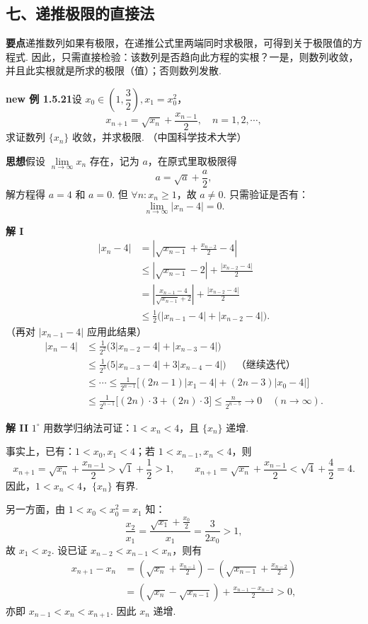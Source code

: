 \documentclass[UTF8, 12pt, fontset=fandol, oneside]{ctexart}
\begin{document}
\subsection*{七、递推极限的直接法}

\noindent\textbf{要点}\quad 递推数列如果有极限，在递推公式里两端同时求极限，可得到关于极限值的方程式. 因此，只需直接检验：该数列是否趋向此方程的实根？一是，则数列收敛，并且此实根就是所求的极限（值）；否则数列发散.

\noindent\textbf{new 例 1.5.21}\quad 设 $x_0\in\left(1,\dfrac32\right),x_1=x_0^2$，
\[
  x_{n+1}=\sqrt{x_n}+\frac{x_{n-1}}2,\quad n=1,2,\cdots,
\]
求证数列 $\{x_n\}$ 收敛，并求极限. （中国科学技术大学）

\noindent\textbf{思想}\quad 假设 $\lim\limits_{n\to\infty}x_n$ 存在，记为 $a$，在原式里取极限得
\[
  a=\sqrt a+\frac a2,
\]
解方程得 $a=4$ 和 $a=0$. 但 $\forall n:x_n\ge 1$，故 $a\ne 0$. 只需验证是否有：
\[
  \lim_{n\to\infty}|x_n-4|=0.
\]

\noindent\textbf{解 I}\quad
\[
\begin{aligned}
  |x_n-4|
  &=\left|\sqrt{x_{n-1}}+\frac{x_{n-2}}2-4\right|\\
  &\le |\sqrt{x_{n-1}}-2|+\frac{|x_{n-2}-4|}{2}\\
  &=\left|\frac{x_{n-1}-4}{\sqrt{x_{n-1}}+2}\right|
    +\frac{|x_{n-2}-4|}{2}\\
  &\le \frac12\bigl(|x_{n-1}-4|+|x_{n-2}-4|\bigr).
\end{aligned}
\]
（再对 $|x_{n-1}-4|$ 应用此结果）
\[
\begin{aligned}
  |x_n-4|
  &\le \frac1{2^2}\bigl(3|x_{n-2}-4|+|x_{n-3}-4|\bigr)\\
  &\le \frac1{2^3}\bigl(5|x_{n-3}-4|+3|x_{n-4}-4|\bigr)
   \quad \text{（继续迭代）}\\
  &\le \cdots \le
   \frac1{2^{n-1}}\bigl[(2n-1)|x_1-4|+(2n-3)|x_0-4|\bigr]\\
  &\le \frac1{2^{n-1}}\bigl[(2n)\cdot 3+(2n)\cdot 3\bigr]
   \le \frac{n}{2^{n-5}}\to 0\quad (n\to\infty).
\end{aligned}
\]

\noindent\textbf{解 II}\quad
$1^\circ$ 用数学归纳法可证：$1<x_n<4$，且 $\{x_n\}$ 递增.

事实上，已有：$1<x_0,x_1<4$；若 $1<x_{n-1},x_n<4$，则
\[
  x_{n+1}=\sqrt{x_n}+\frac{x_{n-1}}2
  >\sqrt1+\frac12>1,\qquad
  x_{n+1}=\sqrt{x_n}+\frac{x_{n-1}}2
  <\sqrt4+\frac42=4.
\]
因此，$1<x_n<4$，$\{x_n\}$ 有界.

另一方面，由 $1<x_0<x_0^2=x_1$ 知：
\[
  \frac{x_2}{x_1}
  =\frac{\sqrt{x_1}+\frac{x_0}{2}}{x_1}
  =\frac{3}{2x_0}>1,
\]
故 $x_1<x_2$. 设已证 $x_{n-2}<x_{n-1}<x_n$，则有
\[
\begin{aligned}
  x_{n+1}-x_n
  &=\left(\sqrt{x_n}+\frac{x_{n-1}}2\right)
    -\left(\sqrt{x_{n-1}}+\frac{x_{n-2}}2\right)\\
  &=(\sqrt{x_n}-\sqrt{x_{n-1}})
    +\frac{x_{n-1}-x_{n-2}}2>0,
\end{aligned}
\]
亦即 $x_{n-1}<x_n<x_{n+1}$. 因此 $x_n$ 递增.
\end{document}
